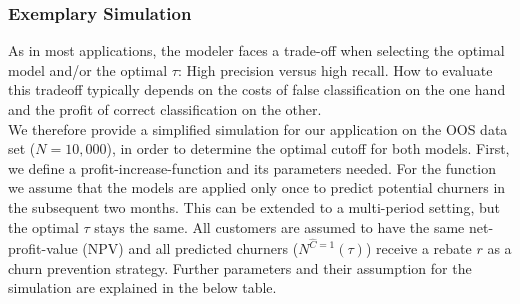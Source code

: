 \documentclass[12pt,titlepage]{article}
\begin{document}
\subsubsection*{Exemplary Simulation}

As in most applications, the modeler faces a trade-off when selecting the optimal model and/or the optimal $\tau$: High precision versus high recall. How to evaluate this tradeoff typically depends on the costs of false classification on the one hand and the profit of correct classification on the other. \\
We therefore provide a simplified simulation for our application on the OOS data set ($N=10,000$), in order to determine the optimal cutoff for both models. First, we define a profit-increase-function and its parameters needed. For the function we assume that the models are applied only once to predict potential churners in the subsequent two months. This can be extended to a multi-period setting, but the optimal $\tau$ stays the same. All customers are assumed to have the same net-profit-value (NPV) and all predicted churners ($N^{\hat{C}=1}(\tau)$) receive a rebate $r$ as a churn prevention strategy. Further parameters and their assumption for the simulation are explained in the below table. \\
\end{document}

